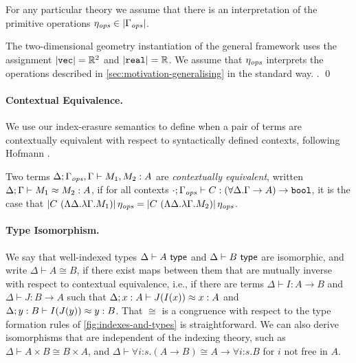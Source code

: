 For any particular theory we assume that there is an
interpretation of the primitive operations $\eta_{\mathit{ops}} \in \left| \Gamma_{\mathit{ops}}\right|$.

\begin{example*}
  The two-dimensional geometry instantiation of the general framework
  uses the assignment $\left| \textup{\texttt{vec}}\right| = \mathbb{R}^2$ and
  $\left| \textup{\texttt{real}}\right| = \mathbb{R}$.
  We assume that $\eta_{\mathit{ops}}$ interprets the operations described in \autoref{sec:motivation-generalising}
  in the standard way. . 
\qed
\end{example*}



\paragraph{Contextual Equivalence.}
We use our index-erasure semantics to define when a pair of terms
are contextually equivalent with respect to syntactically defined
contexts, following Hofmann \cite{hofmann08correctness}.

\begin{definition}\label{defn:ctxt-equiv}
Two terms $\Delta; \Gamma_{\mathit{ops}}, \Gamma \vdash M_1, M_2 : A$
are \emph{contextually equivalent}, written ${\Delta};{\Gamma}\vdash{M_1}\approx{M_2}:{A}$, if 
  for all
  contexts $\cdot;\Gamma_{\mathit{ops}} \vdash C : (\forall \Delta. \Gamma
  \to A) \to \textup{\texttt{bool}}$, it is the case that $\left| C\ (\Lambda
    \Delta. \lambda \Gamma. M_1)\right|\eta_{\mathit{ops}} = \left| C\
    (\Lambda \Delta. \lambda \Gamma. M_2)\right|\eta_{\mathit{ops}}$.
\end{definition}


\paragraph{Type Isomorphism.}
We say that well-indexed types $\Delta \vdash A \textup{\textsf{ type}}$ and $\Delta\vdash B \textup{\textsf{ type}}$
are isomorphic, and write $\Delta\vdash A \cong
B$, if there exist maps between them that are mutually inverse with
respect to contextual equivalence, i.e., if there are terms $\Delta\vdash I
: A \to B$ and $\Delta\vdash J : B\to A$ such that ${\Delta};{x:A}\vdash{J(I(x))}\approx{x}:{A}$ 
and ${\Delta};{y:B}\vdash{I(J(y))}\approx{y}:{B}$.
That $\cong$ is a congruence with respect to the type formation rules
of \autoref{fig:indexes-and-types} is straightforward. We can also
derive isomorphisms that are independent of the indexing theory, such
as $\Delta\vdash A\times B \cong B \times A$, and $\Delta\vdash\forall
i\mathord:s.(A\to B)\cong A\to\forall i\mathord:s.B$ for $i$ not free in $A$.

